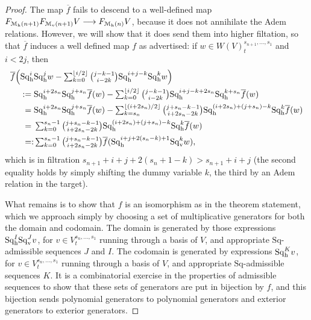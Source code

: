 \documentclass[11pt]{amsart}
\theoremstyle{plain}
\theoremstyle{definition}
\renewcommand{\to}{\longrightarrow}
\newcommand{\calM}{\mathcal{M}}
\theoremstyle{plain}
\newcommand{\Sq}{\mathrm{Sq}}
\newcommand{\Sqh}{\mathrm{Sq}_\textup{h}}
\newcommand{\Sqv}{\mathrm{Sq}_\textup{v}}
\begin{document}
\begin{Cohomology operations for all unstable Lie algebras}
\begin{proof}
The map $\overline{f}$ fails to descend to a well-defined map  $F_{\calM_\textup{h}(n+1)}F_{\calM_\textup{v}(n+1)}V\to F_{\calM_\textup{h}(n)}V$, because it does not annihilate the Adem relations. However, we will show that it does send them into higher filtation, so that $\overline{f}$ induces a well defined map $f$ as advertised: if $w\in W(V)^{s_{n+1},\ldots,s_1}_t$ and $i<2j$, then
\begin{alignat*}{2}
\overline{f}\Bigl(\Sqh^i&\Sqh^jw-\textstyle\sum_{k=0}^{\lfloor i/2\rfloor}{j-k-1\choose i-2k}\Sqh^{i+j-k}\Sqh^{k}w\Bigr)\\
{}:={}&\Sqh^{i+2s_n}\Sqh^{j+s_n}\overline{f}(w)-\textstyle\sum_{k=0}^{\lfloor i/2\rfloor}{j-k-1\choose i-2k}\Sqh^{i+j-k+2s_n}\Sqh^{k+s_n}\overline{f}(w)\\
{}={}&
\Sqh^{i+2s_n}\Sqh^{j+s_n}\overline{f}(w)-\textstyle\sum_{k=s_n}^{\lfloor (i+2s_n)/2\rfloor}{j+s_n-k-1\choose i+2s_n-2k}\Sqh^{(i+2s_n)+(j+s_n)-k}\Sqh^{k}\overline{f}(w)\\
{}={}&\textstyle\sum_{k=0}^{s_n-1}{j+s_n-k-1\choose i+2s_n-2k}\Sqh^{(i+2s_n)+(j+s_n)-k}\Sqh^{k}\overline{f}(w)\\
{}=\makebox[0cm][r]{$:$}{}&\textstyle\sum_{k=0}^{s_n-1}{j+s_n-k-1\choose i+2s_n-2k}\overline{f}(\Sqh^{i+j+2(s_n-k)+1}\Sqv^{k}w),
\end{alignat*}
which is in filtration $s_{n+1}+i+j+2(s_n+1-k)>s_{n+1}+i+j$ (the second equality holds by simply shifting the dummy variable $k$, the third by an Adem relation in the target).

What remains is to show that $f$ is an isomorphism as in the theorem statement, which we approach simply by choosing a set of multiplicative generators for both the domain and codomain. The domain is generated by those expressions $\Sqh^I\Sqv^Jv$, for $v\in V^{s_{n},\ldots,s_1}_t$ running through a basis of $V$, and appropriate $\Sq$-admissible sequences $J$ and $I$. The codomain is generated by expressions $\Sqh^Kv$, for $v\in V^{s_{n},\ldots,s_1}_t$ running through a basis of $V$, and appropriate $\Sq$-admissible sequences $K$. It is a  combinatorial  exercise in the properties of admissible sequences to show that these sets of generators are put in bijection by $f$, and this bijection sends polynomial generators to polynomial generators and exterior generators to exterior generators.
\end{proof}
\end{Cohomology operations for all unstable Lie algebras}
\end{document}

